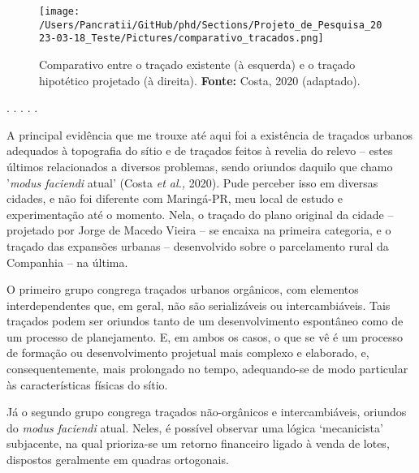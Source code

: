\documentclass[12pt, a4paper]{book} %
\begin{document}
        \begin{figure}[h]
            \centering
            \texttt{[image: /Users/Pancratii/GitHub/phd/Sections/Projeto\_de\_Pesquisa\_2023-03-18\_Teste/Pictures/comparativo\_tracados.png]}
            \captionsetup{labelfont=bf}
            \caption{Comparativo entre o traçado existente (à esquerda) e o traçado hipotético projetado (à direita). \textbf{Fonte:} Costa, 2020 (adaptado).}
            \label{fig:comparativo_tracados}
        \end{figure} 

        \begin{center}
        . . . . .
        \end{center}

        A principal evidência que me trouxe até aqui foi a existência de traçados urbanos adequados à topografia do sítio e de traçados feitos à revelia do relevo – estes últimos relacionados a diversos problemas, sendo oriundos daquilo que chamo '\textit{modus faciendi} atual' (Costa \textit{et al.,} 2020). Pude perceber isso em diversas cidades, e não foi diferente com Maringá-PR, meu local de estudo e experimentação até o momento. Nela, o traçado do plano original da cidade – projetado por Jorge de Macedo Vieira – se encaixa na primeira categoria, e o traçado das expansões urbanas – desenvolvido sobre o parcelamento rural da Companhia – na última.  

        O primeiro grupo congrega traçados urbanos orgânicos, com elementos interdependentes que, em geral, não são serializáveis ou intercambiáveis. Tais traçados podem ser oriundos tanto de um desenvolvimento espontâneo como de um processo de planejamento. E, em ambos os casos, o que se vê é um processo de formação ou desenvolvimento projetual mais complexo e elaborado, e, consequentemente, mais prolongado no tempo, adequando-se de modo particular às características físicas do sítio. 

        Já o segundo grupo congrega traçados não-orgânicos e intercambiáveis, oriundos do \textit{modus faciendi} atual. Neles, é possível observar uma lógica `mecanicista' subjacente, na qual prioriza-se um retorno financeiro ligado à venda de lotes, dispostos geralmente em quadras ortogonais.
\end{document}

